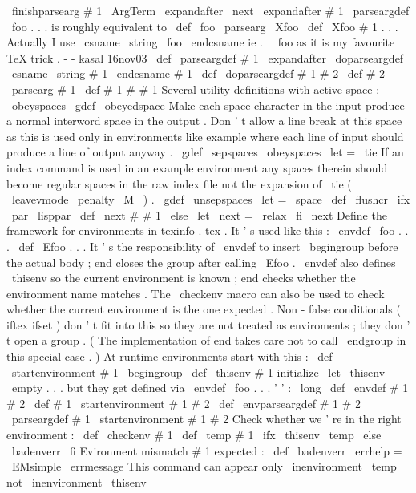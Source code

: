 \
finishparsearg
#
1
\
ArgTerm
{
\
expandafter
\
next
\
expandafter
{
#
1
}
}
%
\
parseargdef
\
foo
{
.
.
.
}
%
is
roughly
equivalent
to
%
\
def
\
foo
{
\
parsearg
\
Xfoo
}
%
\
def
\
Xfoo
#
1
{
.
.
.
}
%
%
Actually
I
use
\
csname
\
string
\
foo
\
endcsname
ie
.
\
\
foo
as
it
is
my
%
favourite
TeX
trick
.
-
-
kasal
16nov03
\
def
\
parseargdef
#
1
{
%
\
expandafter
\
doparseargdef
\
csname
\
string
#
1
\
endcsname
#
1
%
}
\
def
\
doparseargdef
#
1
#
2
{
%
\
def
#
2
{
\
parsearg
#
1
}
%
\
def
#
1
#
#
1
%
}
%
Several
utility
definitions
with
active
space
:
{
\
obeyspaces
\
gdef
\
obeyedspace
{
}
%
Make
each
space
character
in
the
input
produce
a
normal
interword
%
space
in
the
output
.
Don
'
t
allow
a
line
break
at
this
space
as
this
%
is
used
only
in
environments
like
example
where
each
line
of
input
%
should
produce
a
line
of
output
anyway
.
%
\
gdef
\
sepspaces
{
\
obeyspaces
\
let
=
\
tie
}
%
If
an
index
command
is
used
in
an
example
environment
any
spaces
%
therein
should
become
regular
spaces
in
the
raw
index
file
not
the
%
expansion
of
\
tie
(
\
leavevmode
\
penalty
\
M
\
)
.
\
gdef
\
unsepspaces
{
\
let
=
\
space
}
}
\
def
\
flushcr
{
\
ifx
\
par
\
lisppar
\
def
\
next
#
#
1
{
}
\
else
\
let
\
next
=
\
relax
\
fi
\
next
}
%
Define
the
framework
for
environments
in
texinfo
.
tex
.
It
'
s
used
like
this
:
%
%
\
envdef
\
foo
{
.
.
.
}
%
\
def
\
Efoo
{
.
.
.
}
%
%
It
'
s
the
responsibility
of
\
envdef
to
insert
\
begingroup
before
the
%
actual
body
;
end
closes
the
group
after
calling
\
Efoo
.
\
envdef
also
%
defines
\
thisenv
so
the
current
environment
is
known
;
end
checks
%
whether
the
environment
name
matches
.
The
\
checkenv
macro
can
also
be
%
used
to
check
whether
the
current
environment
is
the
one
expected
.
%
%
Non
-
false
conditionals
(
iftex
ifset
)
don
'
t
fit
into
this
so
they
%
are
not
treated
as
enviroments
;
they
don
'
t
open
a
group
.
(
The
%
implementation
of
end
takes
care
not
to
call
\
endgroup
in
this
%
special
case
.
)
%
At
runtime
environments
start
with
this
:
\
def
\
startenvironment
#
1
{
\
begingroup
\
def
\
thisenv
{
#
1
}
}
%
initialize
\
let
\
thisenv
\
empty
%
.
.
.
but
they
get
defined
via
\
envdef
\
foo
{
.
.
.
}
'
'
:
\
long
\
def
\
envdef
#
1
#
2
{
\
def
#
1
{
\
startenvironment
#
1
#
2
}
}
\
def
\
envparseargdef
#
1
#
2
{
\
parseargdef
#
1
{
\
startenvironment
#
1
#
2
}
}
%
Check
whether
we
'
re
in
the
right
environment
:
\
def
\
checkenv
#
1
{
%
\
def
\
temp
{
#
1
}
%
\
ifx
\
thisenv
\
temp
\
else
\
badenverr
\
fi
}
%
Evironment
mismatch
#
1
expected
:
\
def
\
badenverr
{
%
\
errhelp
=
\
EMsimple
\
errmessage
{
This
command
can
appear
only
\
inenvironment
\
temp
not
\
inenvironment
\
thisenv
}
%
}

